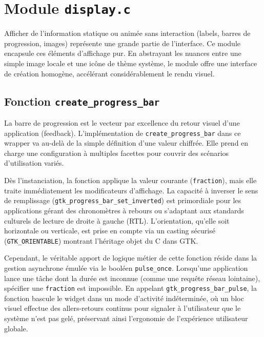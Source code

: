\section{Module \texttt{display.c}}

Afficher de l'information statique ou animée sans interaction (labels, barres de progression, images) représente une grande partie de l'interface. Ce module encapsule ces éléments d'affichage pur. En abstrayant les nuances entre une simple image locale et une icône de thème système, le module offre une interface de création homogène, accélérant considérablement le rendu visuel.

\subsection{Fonction \texttt{create\_progress\_bar}}

La barre de progression est le vecteur par excellence du retour visuel d'une application (feedback). L'implémentation de \texttt{create\_progress\_bar} dans ce wrapper va au-delà de la simple définition d'une valeur chiffrée. Elle prend en charge une configuration à multiples facettes pour couvrir des scénarios d'utilisation variés.

Dès l'instanciation, la fonction applique la valeur courante (\texttt{fraction}), mais elle traite immédiatement les modificateurs d'affichage. La capacité à inverser le sens de remplissage (\texttt{gtk\_progress\_bar\_set\_inverted}) est primordiale pour les applications gérant des chronomètres à rebours ou s'adaptant aux standards culturels de lecture de droite à gauche (RTL). L'orientation, qu'elle soit horizontale ou verticale, est prise en compte via un casting sécurisé (\texttt{GTK\_ORIENTABLE}) montrant l'héritage objet du C dans GTK.

Cependant, le véritable apport de logique métier de cette fonction réside dans la gestion asynchrone émulée via le booléen \texttt{pulse\_once}. Lorsqu'une application lance une tâche dont la durée est inconnue (comme une requête réseau lointaine), spécifier une \texttt{fraction} est impossible. En appelant \texttt{gtk\_progress\_bar\_pulse}, la fonction bascule le widget dans un mode d'activité indéterminée, où un bloc visuel effectue des allers-retours continus pour signaler à l'utilisateur que le système n'est pas gelé, préservant ainsi l'ergonomie de l'expérience utilisateur globale.

